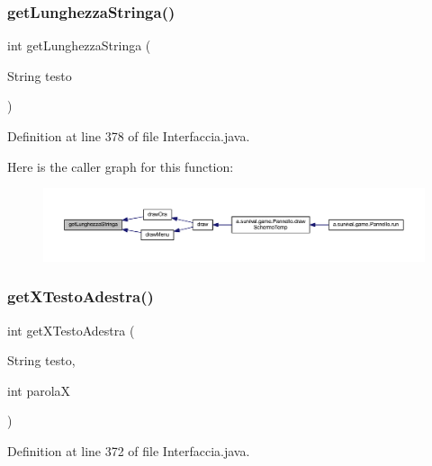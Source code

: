 \subsubsection{\texorpdfstring{get\+Lunghezza\+Stringa()}{getLunghezzaStringa()}}
{\footnotesize\ttfamily int get\+Lunghezza\+Stringa (\begin{DoxyParamCaption}\item[{String}]{testo }\end{DoxyParamCaption})}



Definition at line 378 of file Interfaccia.\+java.

Here is the caller graph for this function\+:
\nopagebreak
\begin{figure}[H]
\begin{center}
\leavevmode
\includegraphics[width=350pt]{classa_1_1survival_1_1game_1_1_interfaccia_a5e33eb51424c4888d0cd26cf5e0311de_icgraph}
\end{center}
\end{figure}
\mbox{\label{classa_1_1survival_1_1game_1_1_interfaccia_a587ecc556d77a50194f3e80ca09551ce}} 
\subsubsection{\texorpdfstring{get\+X\+Testo\+Adestra()}{getXTestoAdestra()}}
{\footnotesize\ttfamily int get\+X\+Testo\+Adestra (\begin{DoxyParamCaption}\item[{String}]{testo,  }\item[{int}]{parolaX }\end{DoxyParamCaption})}



Definition at line 372 of file Interfaccia.\+java.

